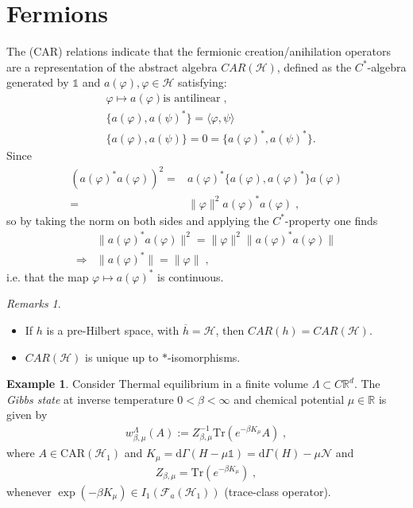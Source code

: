 \documentclass[
a4paper, %
11pt, %
onecolumn, %
openany, %
]{memoir}
\theoremstyle{definition}
\newtheorem{example}[definition]{Example}
\theoremstyle{remark}
\newtheorem{remarks}[definition]{Remarks}
\theoremstyle{plain}
\begin{document}
\section{Fermions}
The (CAR) relations indicate that the fermionic creation/anihilation operators are a representation of the abstract algebra $CAR(\mathcal{H})$, defined as the $C^*$-algebra generated by $\mathds{1}$ and $a(\varphi), \varphi\in\mathcal{H}$ satisfying: \begin{align}
	&\varphi\mapsto a(\varphi) \text{is antilinear}\; ,\\
	&\{a(\varphi),a(\psi)^*\}=\langle\varphi,\psi\rangle \label{eqn::comm_car}\\
	&\{a(\varphi), a(\psi)\} =0=\{a(\varphi)^*,a(\psi)^*\}. 
\end{align}
Since \begin{align}
(a(\varphi)^*a(\varphi))^2=&a(\varphi)^*\{a(\varphi),a(\varphi)^*\}a(\varphi)\\
=&\|\varphi\|^2a(\varphi)^*a(\varphi)\;,\end{align}
so by taking the norm on both sides and applying the $C^*$-property one finds \begin{align}
&\|a(\varphi)^*a(\varphi)\|^2=\|\varphi\|^2\|a(\varphi)^*a(\varphi)\|\\
\Rightarrow&\|a(\varphi)^*\|=\|\varphi\|\; ,
\end{align}
i.e. that the map $\varphi\mapsto a(\varphi)^*$ is continuous. \begin{remarks}
	\begin{itemize}
		\item If $h$ is a pre-Hilbert space, with $\overline{h}=\mathcal{H}$, then $CAR(h)=CAR(\mathcal{H})$.
		\item $CAR(\mathcal{H})$ is unique up to $*$-isomorphisms.
	\end{itemize}
\end{remarks}
\begin{example} Consider Thermal equilibrium in a finite volume $\Lambda \subset C\mathbb{R}^d$. The \textit{Gibbs state} at inverse temperature $0<\beta<\infty$ and chemical potential $\mu\in\mathbb{R}$ is given by \begin{align}
w_{\beta,\mu}^{\Lambda}(A):=Z^{-1}_{\beta,\mu} \mathrm{Tr}(e^{-\beta K_{\mu}}A)\; ,\label{Eqn::def_gibbs_state}
\end{align}
where $A\in \mathrm{CAR}(\mathcal{H}_1)$ and $K_{\mu}=\mathrm{d}\Gamma(H-\mu\mathds{1})=\mathrm{d}\Gamma(H)-\mu\mathcal{N}$ and \begin{align}
Z_{\beta,\mu}=\mathrm{Tr}(e^{-\beta K_{\mu}})\; ,
\end{align}
whenever $\exp(-\beta K_{\mu})\in I_1(\mathcal{F}_a(\mathcal{H}_1))$ (trace-class operator).\end{example}
\end{document}
